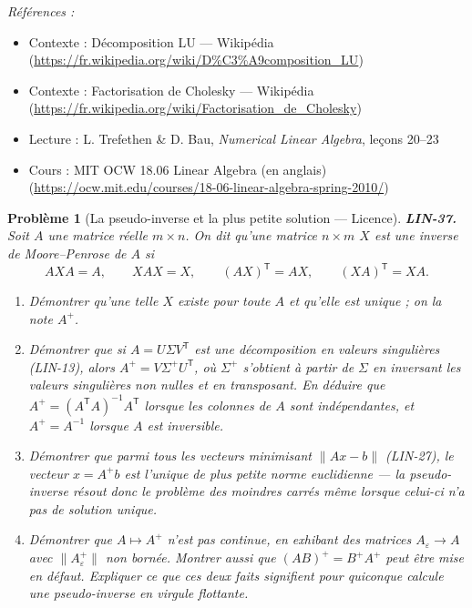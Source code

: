 \documentclass[11pt]{article}
\newtheorem{problem}{Problème}
\newenvironment{refs}{\par\small\noindent\emph{Références :}\begin{itemize}\setlength\itemsep{0pt}}{\end{itemize}\normalsize}
\begin{document}
\begin{refs}
\item Contexte : Décomposition LU --- Wikipédia (\url{https://fr.wikipedia.org/wiki/D%C3%A9composition_LU})
\item Contexte : Factorisation de Cholesky --- Wikipédia (\url{https://fr.wikipedia.org/wiki/Factorisation_de_Cholesky})
\item Lecture : L. Trefethen \& D. Bau, \textit{Numerical Linear Algebra}, leçons 20--23
\item Cours : MIT OCW 18.06 Linear Algebra (en anglais) (\url{https://ocw.mit.edu/courses/18-06-linear-algebra-spring-2010/})
\end{refs}

\bigskip

\begin{problem}[{La pseudo-inverse et la plus petite solution --- Licence}]
\textbf{LIN-37.} Soit $A$ une matrice réelle $m \times n$. On dit qu'une matrice
$n \times m$ $X$ est une \textit{inverse de Moore--Penrose} de $A$ si
\[ AXA = A, \qquad XAX = X, \qquad (AX)^{\mathsf{T}} = AX, \qquad (XA)^{\mathsf{T}} = XA . \]
\begin{enumerate}
\item[(a)] Démontrer qu'une telle $X$ existe pour toute $A$ et qu'elle est unique ; on la note $A^{+}$.
\item[(b)] Démontrer que si $A = U \Sigma V^{\mathsf{T}}$ est une décomposition en valeurs singulières
(LIN-13), alors $A^{+} = V \Sigma^{+} U^{\mathsf{T}}$, où $\Sigma^{+}$ s'obtient à partir de
$\Sigma$ en inversant les valeurs singulières non nulles et en transposant. En déduire que
$A^{+} = (A^{\mathsf{T}}A)^{-1}A^{\mathsf{T}}$ lorsque les colonnes de $A$ sont indépendantes, et
$A^{+} = A^{-1}$ lorsque $A$ est inversible.
\item[(c)] Démontrer que parmi tous les vecteurs minimisant $\|Ax - b\|$ (LIN-27), le vecteur $x = A^{+}b$
est l'unique de plus petite norme euclidienne --- la pseudo-inverse résout donc le problème des moindres
carrés même lorsque celui-ci n'a pas de solution unique.
\item[(d)] Démontrer que $A \mapsto A^{+}$ n'est pas continue, en exhibant des matrices
$A_\varepsilon \to A$ avec $\|A_\varepsilon^{+}\|$ non bornée. Montrer aussi que
$(AB)^{+} = B^{+}A^{+}$ peut être mise en défaut. Expliquer ce que ces deux faits signifient pour
quiconque calcule une pseudo-inverse en virgule flottante.
\end{enumerate}

\end{problem}
\end{document}
